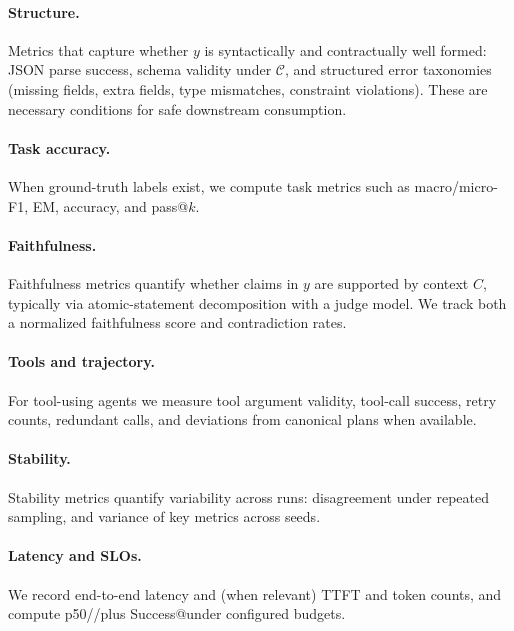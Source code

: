 \paragraph{Structure.}
Metrics that capture whether $y$ is syntactically and contractually well formed:
JSON parse success, schema validity under $\mathcal{C}$, and structured error taxonomies (missing fields, extra fields, type mismatches, constraint violations).
These are necessary conditions for safe downstream consumption.

\paragraph{Task accuracy.}
When ground-truth labels exist, we compute task metrics such as macro/micro-F1, EM, accuracy, and pass@$k$.

\paragraph{Faithfulness.}
Faithfulness metrics quantify whether claims in $y$ are supported by context $C$, typically via atomic-statement decomposition with a judge model.
We track both a normalized faithfulness score and contradiction rates.

\paragraph{Tools and trajectory.}
For tool-using agents we measure tool argument validity, tool-call success, retry counts, redundant calls, and deviations from canonical plans when available.

\paragraph{Stability.}
Stability metrics quantify variability across runs: disagreement under repeated sampling, and variance of key metrics across seeds.

\paragraph{Latency and SLOs.}
We record end-to-end latency and (when relevant) TTFT and token counts, and compute p50/\pninetyfive/\pninetynine plus Success@\slo under configured budgets.

\medskip

